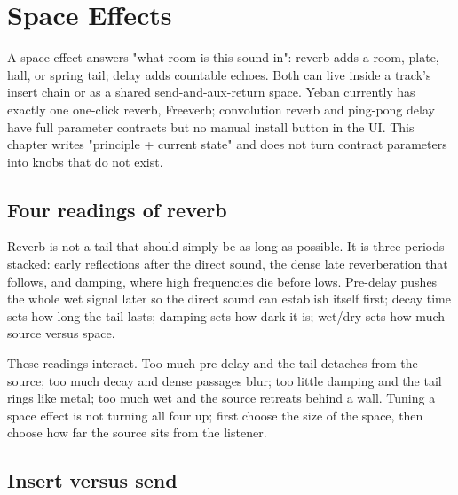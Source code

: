\chapter{Space Effects}
\label{chap:space-effects}


A space effect answers "what room is this sound in": reverb adds a room, plate, hall, or spring tail; delay adds countable echoes. Both can live inside a track's insert chain or as a shared send-and-aux-return space. Yeban currently has exactly one one-click reverb, Freeverb; convolution reverb and ping-pong delay have full parameter contracts but no manual install button in the UI. This chapter writes "principle + current state" and does not turn contract parameters into knobs that do not exist.

\section{Four readings of reverb}

Reverb is not a tail that should simply be as long as possible. It is three periods stacked: early reflections after the direct sound, the dense late reverberation that follows, and damping, where high frequencies die before lows. Pre-delay pushes the whole wet signal later so the direct sound can establish itself first; decay time sets how long the tail lasts; damping sets how dark it is; wet/dry sets how much source versus space.

These readings interact. Too much pre-delay and the tail detaches from the source; too much decay and dense passages blur; too little damping and the tail rings like metal; too much wet and the source retreats behind a wall. Tuning a space effect is not turning all four up; first choose the size of the space, then choose how far the source sits from the listener.

\section{Insert versus send}

